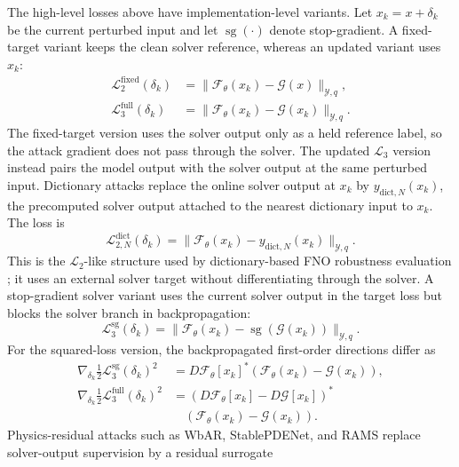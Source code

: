 \documentclass[letterpaper]{article} %
\begin{document}
The high-level losses above have implementation-level variants. Let
$x_k=x+\delta_k$ be the current perturbed input and let
$\operatorname{sg}(\cdot)$ denote stop-gradient. A fixed-target variant keeps the
clean solver reference, whereas an updated variant uses $x_k$:
\begin{align}
  \mathcal{L}_2^{\mathrm{fixed}}(\delta_k)
  &=
  \|\mathcal{F}_\theta(x_k)-\mathcal{G}(x)\|_{\mathcal{Y},q},
  \nonumber\\
  \mathcal{L}_3^{\mathrm{full}}(\delta_k)
  &=
  \|\mathcal{F}_\theta(x_k)-\mathcal{G}(x_k)\|_{\mathcal{Y},q}.
\end{align}
The fixed-target version uses the solver output only as a held reference label,
so the attack gradient does not pass through the solver. The updated
$\mathcal{L}_3$ version instead pairs the model output with the solver output at
the same perturbed input.
Dictionary attacks replace the online solver output at $x_k$ by
$y_{\mathrm{dict},N}(x_k)$, the precomputed solver output attached to the nearest
dictionary input to $x_k$. The loss is
\begin{equation*}
  \mathcal{L}_{2,N}^{\mathrm{dict}}(\delta_k)
  =
  \|\mathcal{F}_\theta(x_k)-y_{\mathrm{dict},N}(x_k)\|_{\mathcal{Y},q}.
\end{equation*}
This is the $\mathcal{L}_2$-like structure used by dictionary-based FNO
robustness evaluation \citep{adesoji2022evaluating}; it uses an external solver
target without differentiating through the solver. A stop-gradient solver
variant uses the current solver output in the target loss but blocks the
solver branch in backpropagation:
\begin{equation}
  \mathcal{L}_3^{\mathrm{sg}}(\delta_k)
  =
  \|\mathcal{F}_\theta(x_k)-\operatorname{sg}(\mathcal{G}(x_k))\|_{\mathcal{Y},q}.
\end{equation}
For the squared-loss version, the backpropagated first-order directions differ
as
\begin{align}
  \nabla_{\delta_k}\tfrac{1}{2}\mathcal{L}_3^{\mathrm{sg}}(\delta_k)^2
  &=
  D\mathcal{F}_\theta[x_k]^*
  (\mathcal{F}_\theta(x_k)-\mathcal{G}(x_k)),
  \nonumber\\
  \nabla_{\delta_k}\tfrac{1}{2}\mathcal{L}_3^{\mathrm{full}}(\delta_k)^2
  &=
  (D\mathcal{F}_\theta[x_k]-D\mathcal{G}[x_k])^*
  \nonumber\\
  &\quad
  (\mathcal{F}_\theta(x_k)-\mathcal{G}(x_k)).
\end{align}
Physics-residual attacks such as WbAR, StablePDENet, and RAMS replace
solver-output supervision by a residual surrogate
\end{document}
